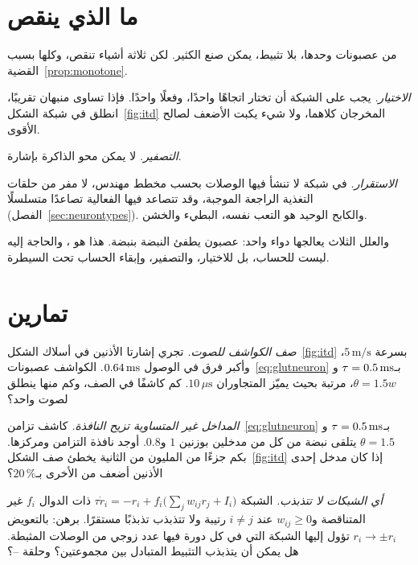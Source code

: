 \section{ما الذي ينقص}

من عصبونات  وحدها، بلا تثبيط، يمكن صنع الكثير. لكن ثلاثة أشياء تنقص، وكلها بسبب القضية~\ref{prop:monotone}.

\emph{الاختيار.} يجب على الشبكة أن تختار اتجاهًا واحدًا، وفعلًا واحدًا. فإذا تساوى منبهان تقريبًا، انطلق في شبكة الشكل~\ref{fig:itd} المخرجان كلاهما، ولا شيء يكبت الأضعف لصالح الأقوى.

\emph{التصفير.} لا يمكن محو الذاكرة بإشارة.

\emph{الاستقرار.} في شبكة لا تنشأ فيها الوصلات بحسب مخطط مهندس، لا مفر من حلقات التغذية الراجعة الموجبة، وقد تتصاعد فيها الفعالية تصاعدًا متسلسلًا (الفصل~\ref{sec:neurontypes}). والكابح الوحيد هو التعب نفسه، البطيء والخشن.

والعلل الثلاث يعالجها دواء واحد: عصبون يطفئ النبضة بنبضة. هذا هو ، والحاجة إليه ليست للحساب، بل للاختيار، والتصفير، وإبقاء الحساب تحت السيطرة.

\section{تمارين}

\begin{exercise}[\lvlA]
\label{ex:02:1}
\emph{صف الكواشف للصوت.} تجري إشارتا الأذنين في أسلاك الشكل~\ref{fig:itd} بسرعة $5\,\text{m/s}$، وأكبر فرق في الوصول $0.64\,\text{ms}$. الكواشف عصبونات~\eqref{eq:glutneuron} بـ$\tau=0.5\,\text{ms}$ و$\theta=1.5w$، مرتبة بحيث يميّز المتجاوران $10\,\mu\text{s}$. كم كاشفًا في الصف، وكم منها ينطلق لصوت واحد؟
\end{exercise}

\begin{exercise}[\lvlB]
\label{ex:02:2}
\emph{المداخل غير المتساوية تزيح النافذة.} كاشف تزامن~\eqref{eq:glutneuron} بـ$\tau=0.5\,\text{ms}$ و$\theta=1.5$ يتلقى نبضة من كل من مدخلين بوزنين $1$ و$0.8$. أوجد نافذة التزامن ومركزها. بكم جزءًا من المليون من الثانية يخطئ صف الشكل~\ref{fig:itd} إذا كان مدخل إحدى الأذنين أضعف من الأخرى بـ$20\,\%$؟
\end{exercise}

\begin{exercise}[\lvlB]
\label{ex:02:3}
\emph{أي الشبكات لا تتذبذب.} الشبكة $\tau\dot r_i=-r_i+f_i\bigl(\textstyle\sum_jw_{ij}r_j+I_i\bigr)$ ذات الدوال $f_i$ غير المتناقصة و$w_{ij}\ge0$ عند $i\ne j$ رتيبة ولا تتذبذب تذبذبًا مستقرًا. برهن: بالتعويض $r_i\to\pm r_i$ تؤول إليها الشبكة التي في كل دورة فيها عدد زوجي من الوصلات المثبطة. هل يمكن أن يتذبذب التثبيط المتبادل بين مجموعتين؟ وحلقة \foreignlanguage{english}{--}؟
\end{exercise}

